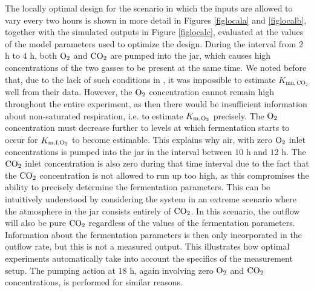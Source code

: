 The locally optimal design for the scenario in which the inputs are allowed to vary every two hours is shown in more detail in Figures \ref{figlocala} and  \ref{figlocalb}, together with the simulated outputs in Figure \ref{figlocalc}, evaluated at the values of the model parameters used to optimize the design. During the interval from $2$ h to $4$ h, both $\text{O}_2$ and $\text{CO}_2$ are pumped into the jar, which causes high concentrations of the two gasses to be present at the same time. We noted before that, due to the lack of such conditions in \textcite{ho}, it was impossible to estimate $K_{\text{mn},\text{CO}_2}$ well from their data. However, the $\text{O}_2$ concentration cannot remain high throughout the entire experiment, as then there would be insufficient information about non-saturated respiration, i.e. to estimate $K_{\text{m}, \text{O}_2}$ precisely. The $\text{O}_2$ concentration must decrease further to levels at which fermentation starts to occur for $K_{\text{m,f},\text{O}_2}$ to become estimable. This explains why air, with zero $\text{O}_2$ inlet concentrations is pumped into the jar in the interval between $10$ h and $12$ h. The $\text{CO}_2$ inlet concentration is also zero during that time interval due to the fact that the $\text{CO}_2$ concentration is not allowed to run up too high, as this compromises the ability to precisely determine the fermentation parameters. This can be intuitively understood by considering the system in an extreme scenario where the atmosphere in the jar consists entirely of $\text{CO}_2$. In this scenario, the outflow will also be pure $\text{CO}_2$ regardless of the values of the fermentation parameters. Information about the fermentation parameters is then only incorporated in the outflow rate, but this is not a measured output. This illustrates how optimal experiments automatically take into account the specifics of the measurement setup.  The pumping action at $18$ h, again involving zero $\text{O}_2$ and $\text{CO}_2$ concentrations, is performed for similar reasons.
